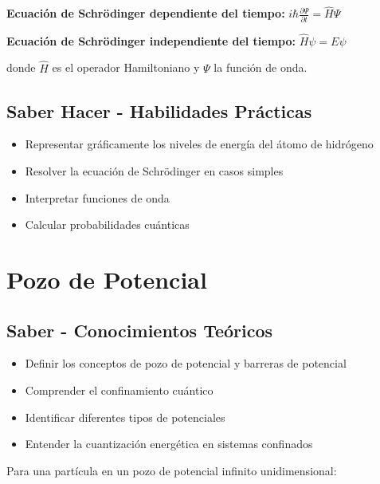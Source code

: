 \documentclass[12pt,a4paper,twoside]{book}
\begin{document}
	\begin{ecuacionbox}
		\textbf{Ecuación de Schrödinger dependiente del tiempo:}
		$i\hbar \frac{\partial \Psi}{\partial t} = \hat{H}\Psi$
		
		\textbf{Ecuación de Schrödinger independiente del tiempo:}
		$\hat{H}\psi = E\psi$
		
		donde $\hat{H}$ es el operador Hamiltoniano y $\Psi$ la función de onda.
	\end{ecuacionbox}
	
	\subsection{Saber Hacer - Habilidades Prácticas}
	\begin{hacerbox}
		\begin{itemize}
			\item Representar gráficamente los niveles de energía del átomo de hidrógeno
			\item Resolver la ecuación de Schrödinger en casos simples
			\item Interpretar funciones de onda
			\item Calcular probabilidades cuánticas
		\end{itemize}
	\end{hacerbox}
	
	\section{Pozo de Potencial}
	\label{sec:pozo_potencial}
	
	\subsection{Saber - Conocimientos Teóricos}
	\begin{saberbox}
		\begin{itemize}
			\item Definir los conceptos de pozo de potencial y barreras de potencial
			\item Comprender el confinamiento cuántico
			\item Identificar diferentes tipos de potenciales
			\item Entender la cuantización energética en sistemas confinados
		\end{itemize}
	\end{saberbox}
	
	Para una partícula en un pozo de potencial infinito unidimensional:
	
\end{document}
